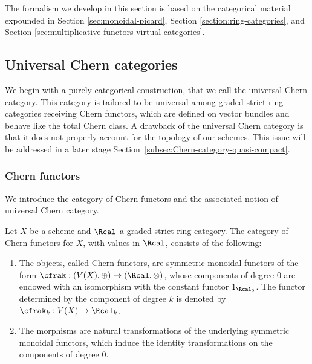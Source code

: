 The formalism we develop in this section is based on the categorical material expounded in Section \ref{sec:monoidal-picard}, Section \ref{section:ring-categories}, and Section \ref{sec:multiplicative-functors-virtual-categories}.

\subsection{Universal Chern categories}\label{subsec:universal-chern-categories}
We begin with a purely categorical construction, that we call the universal Chern category. This category is tailored to be universal among graded strict ring categories receiving Chern functors, which are defined on vector bundles and behave like the total Chern class. A drawback of the universal Chern category is that it does not properly account for the topology of our schemes. This issue will be addressed in a later stage Section~\ref{subsec:Chern-category-quasi-compact}.

\subsubsection{Chern functors}
We introduce the category of Chern functors and the associated notion of universal Chern category.
\begin{definition}\label{def:axiom-chern-functor}
Let $X$ be a scheme and $\Rcal$ a graded strict ring category. The category of Chern functors for $X$, with values in $\Rcal$, consists of the following:
\begin{enumerate}
\item The objects, called Chern functors, are symmetric monoidal functors of the form $\cfrak: (V(X),\oplus) \to (\Rcal,\otimes)$, whose components of degree $0$ are endowed with an isomorphism with the constant functor $1_{\Rcal_{0}}$. The functor determined by the component of degree $k$ is denoted by $\cfrak_k : V(X) \to \Rcal_k$.
\item The morphisms are natural transformations of the underlying symmetric monoidal functors, which induce the identity transformations on the components of degree 0.
\end{enumerate}
\end{definition}

